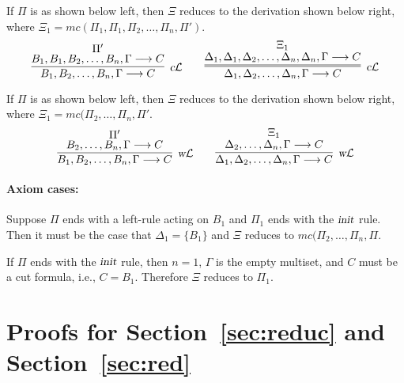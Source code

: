 \documentclass[preprint]{elsarticle}
\newcommand{\Seq}[2]{#1\longrightarrow #2}
\newcommand{\cL}{\hbox{\sl c}{\cal L}}
\newcommand{\circL}{\circ{\cal L}}
\newcommand{\init}{\hbox{\sl init}}
\newcommand{\wL}{\hbox{\sl w}{\cal L}}
\begin{document}
\begin{trivlist}
\item[\fbox{$-/\cL$}] If $\Pi$ is as shown below left, then
$\Xi$ reduces to the derivation shown below right, 
where $\Xi_1 = mc(\Pi_1,\Pi_1,\Pi_2,\ldots,\Pi_n,\Pi')$. 
  \begin{displaymath}
    \infer[\cL]{\Seq{B_1,B_2,\ldots,B_n,\Gamma}{C}}
    {\deduce{\Seq{B_1,B_1,B_2,\ldots,B_n,\Gamma}{C}}
      {\Pi'}}
    \qquad
    \infer=[\cL]
    {\Seq{\Delta_1,\Delta_2,\ldots,\Delta_n,\Gamma}{C}}
    {
      \deduce{\Seq{\Delta_1,\Delta_1,\Delta_2,\ldots,\Delta_n,\Delta_n,\Gamma}{C}}{\Xi_1}
    }
  \end{displaymath}


\item[\fbox{$-/\wL$}] If $\Pi$ is as shown below left,
then $\Xi$ reduces to the derivation shown below right, where
$\Xi_1 = mc(\Pi_2,\ldots,\Pi_n,\Pi'$.
  \begin{displaymath}
    \infer[\wL]{\Seq{B_1,B_2,\ldots,B_n,\Gamma}{C}}
    {\deduce{\Seq{B_2,\ldots,B_n,\Gamma}{C}}
      {\Pi'}}
    \qquad
    \infer[\wL]
    {\Seq{\Delta_1,\Delta_2,\ldots,\Delta_n,\Gamma}{C}}
    {
      \deduce{\Seq{\Delta_2,\ldots,\Delta_n,\Gamma}{C}}{\Xi_1}
    }
  \end{displaymath}


\end{trivlist}

\paragraph{Axiom cases:}

\begin{trivlist}
\item[\fbox{$\init/\circL$}] Suppose $\Pi$ ends with a left-rule acting on
  $B_1$ and $\Pi_1$ ends with the $\init$ rule. Then it must be the
  case that $\Delta_1 = \{B_1\}$ and $\Xi$ reduces to
  $mc(\Pi_2,\ldots,\Pi_n,\Pi$.



\item[\fbox{$-/\init$}] If $\Pi$ ends with the $\init$ rule, then $n = 1$,
  $\Gamma$ is the empty multiset, and $C$ must be a cut formula, i.e.,
  $C = B_1$. Therefore $\Xi$ reduces to $\Pi_1$.
\end{trivlist}



\section{Proofs for Section~\ref{sec:reduc} and Section~\ref{sec:red}}
\label{app:red}
\end{document}
